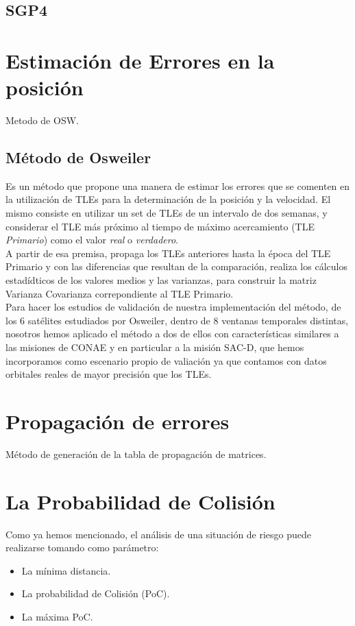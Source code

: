 \subsection*{SGP4}{\label{subsec:sgp4model}}

\section{Estimaci\'on de Errores en la posici\'on}
Metodo de OSW.
\subsection{M\'etodo de Osweiler}
Es un m\'etodo que propone una manera de estimar los errores que se comenten en la utilizaci\'on de TLEs para la determinaci\'on de la posici\'on y la velocidad.
 El mismo consiste en utilizar un set de TLEs de un intervalo de dos semanas, y considerar el TLE m\'as pr\'oximo al tiempo de m\'aximo acercamiento (TLE  {\it{Primario}}) como el valor {\it{real}} o {\it{verdadero}}.\\
 A partir de esa premisa, propaga los TLEs anteriores hasta la \'epoca del TLE Primario y con las diferencias que resultan de la comparaci\'on, realiza los c\'alculos estad\'idticos de los valores medios y las varianzas, para construir la matriz Varianza Covarianza correpondiente al TLE Primario.\\
 Para hacer los estudios de validaci\'on de nuestra implementaci\'on del m\'etodo, de los 6 sat\'elites estudiados por Osweiler, dentro de 8 ventanas temporales distintas, nosotros hemos aplicado el m\'etodo a dos de ellos con caracter\'isticas similares a las misiones de CONAE y en particular a la misi\'on SAC-D, que hemos incorporamos como escenario propio de valiaci\'on ya que contamos con datos orbitales reales de mayor precisi\'on que los TLEs.

 \section{Propagaci\'on de errores}
 M\'etodo de generaci\'on de la tabla de propagaci\'on de matrices. 

\section{La Probabilidad de Colisi\'on}

Como ya hemos mencionado, el an\'alisis de una situaci\'on de riesgo puede realizarse tomando como par\'ametro:\\
\begin{itemize}
 \item La m\'inima distancia.
 \item La probabilidad de Colisi\'on (PoC).
 \item La m\'axima PoC.
\end{itemize}

